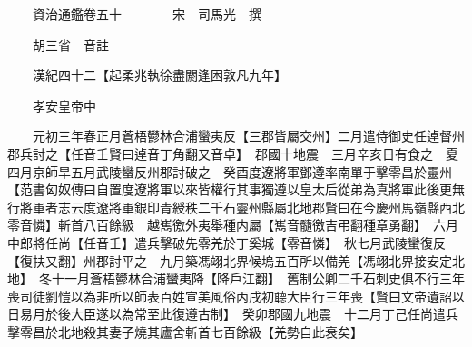 










 


 
 


 

  
  
  
  
  





  
  
  
  
  
 
  

  

  
  
  



  

 
 

  
   




  

  
  


  　　資治通鑑卷五十　　　　宋　司馬光　撰

　　胡三省　音註

　　漢紀四十二【起柔兆執徐盡閼逢困敦凡九年】

　　孝安皇帝中

　　元初三年春正月蒼梧鬰林合浦蠻夷反【三郡皆屬交州】二月遣侍御史任逴督州郡兵討之【任音壬賢曰逴音丁角翻又音卓】　郡國十地震　三月辛亥日有食之　夏四月京師旱五月武陵蠻反州郡討破之　癸酉度遼將軍鄧遵率南單于擊零昌於靈州【范書匈奴傳曰自置度遼將軍以來皆權行其事獨遵以皇太后從弟為真將軍此後更無行將軍者志云度遼將軍銀印青綬秩二千石靈州縣屬北地郡賢曰在今慶州馬嶺縣西北零音憐】斬首八百餘級　越嶲徼外夷舉種内屬【嶲音髓徼吉弔翻種章勇翻】　六月中郎將任尚【任音壬】遣兵擊破先零羌於丁奚城【零音憐】　秋七月武陵蠻復反【復扶又翻】州郡討平之　九月築馮翊北界候塢五百所以備羌【馮翊北界接安定北地】　冬十一月蒼梧鬰林合浦蠻夷降【降戶江翻】　舊制公卿二千石刺史俱不行三年喪司徒劉愷以為非所以師表百姓宣美風俗丙戌初聼大臣行三年喪【賢曰文帝遺詔以日易月於後大臣遂以為常至此復遵古制】　癸卯郡國九地震　十二月丁己任尚遣兵擊零昌於北地殺其妻子燒其廬舍斬首七百餘級【羌勢自此衰矣】

